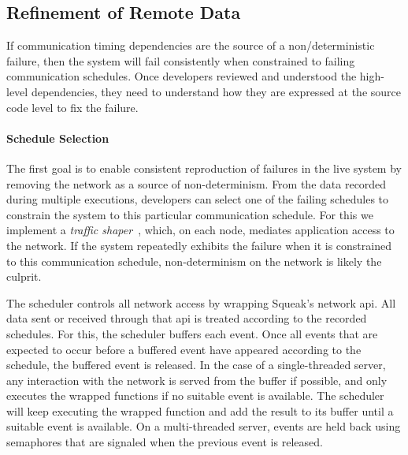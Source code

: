 \documentclass[preprint,3p]{elsarticle}
\newcommand{\ac}[1]{\gls{#1}}
\begin{document}

\subsection{Refinement of Remote Data}
\label{sec:data-refinement}

If communication timing dependencies are the source of a
non\-/deterministic failure, then the system will fail consistently
when constrained to failing communication schedules. Once developers
reviewed and understood the high-level dependencies, they need to
understand how they are expressed at the source code level to fix the
failure.

\paragraph{Schedule Selection}
\label{sec:traffic-shaper}
The first goal is to enable consistent reproduction of failures in
the live system by removing the network as a source of
non-determinism. From the data recorded during multiple executions,
developers can select one of the failing schedules to constrain the
system to this particular communication schedule. For this we
implement a \emph{traffic shaper}~\cite{IetfShaper}, which, on each
node, mediates application access to the network. If the system
repeatedly exhibits the failure when it is constrained to this
communication schedule, non-determinism on the network is likely the
culprit.

The scheduler controls all network access by wrapping Squeak's network
\ac{api}. All data sent or received through that \ac{api} is treated
according to the recorded schedules. For this, the scheduler buffers
each event. Once all events that are expected to occur before a
buffered event have appeared according to the schedule, the buffered
event is released. In the case of a single-threaded server, any
interaction with the network is served from the buffer if possible,
and only executes the wrapped functions if no suitable event is
available. The scheduler will keep executing the wrapped function and
add the result to its buffer until a suitable event is available. On a
multi-threaded server, events are held back using semaphores that are
signaled when the previous event is released.
\end{document}
